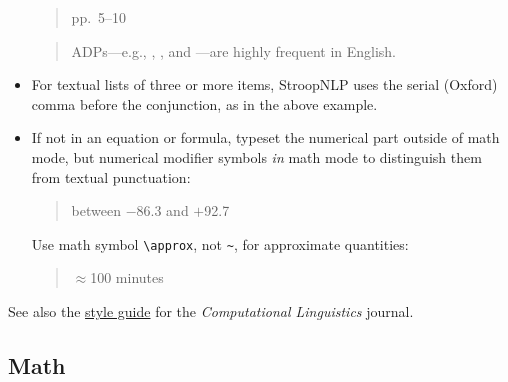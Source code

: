 \begin{itemize}
    \begin{quote}
    pp.~5--10
    \end{quote}
    \begin{quote}
    ADPs---e.g., , , and ---are highly frequent in English.
    \end{quote}
    \item For textual lists of three or more items, StroopNLP uses the serial (Oxford) comma before the conjunction, as in the above example.
    \item If not in an equation or formula, typeset the numerical part outside of math mode, but numerical modifier symbols \emph{in} math mode to distinguish them from textual punctuation:

    \begin{quote}
    between $-$86.3 and $+$92.7
    \end{quote}

    Use math symbol \verb|\approx|, not \verb|~|, for approximate quantities:

    \begin{quote}
    $\approx$100 minutes
    \end{quote}
\end{itemize}

See also the \href{http://cljournal.org/style_guide_general.html}{style guide} for the \emph{Computational Linguistics} journal.

\subsection{Math}

